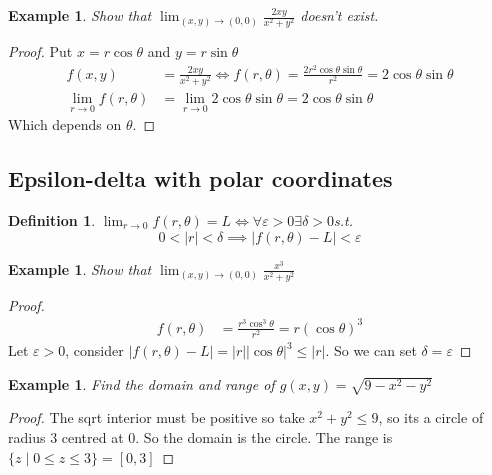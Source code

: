 \documentclass[oneside,11pt,pdftex]{book}%
\numberwithin{equation}{section}
\newtheorem{example}[theorem]{Example}
\newtheorem{definition}[theorem]{Definition}
\numberwithin{section}{chapter}
\numberwithin{equation}{chapter}
\begin{document}
\begin{example}
	Show that $ \lim_{(x,y)\rightarrow (0,0)} \frac{2xy}{x^2+y^2} $ doesn't exist.
\end{example}
\begin{proof}
	Put $ x=r\cos \theta  $ and $ y= r \sin \theta  $
	\begin{align*}
		f(x,y)&=\frac{2xy}{x^2+y^2} \iff f(r,\theta )= \frac{2r^2 \cos \theta \sin \theta }{r^2 }=2 \cos \theta \sin \theta \\
		\lim_{r \rightarrow 0 }f(r,\theta )&=\lim_{r \rightarrow 0}2 \cos \theta \sin \theta = 2 \cos \theta \sin \theta 
	\end{align*}
Which depends on $ \theta  $.
\end{proof}

\subsection{Epsilon-delta with polar coordinates}
\begin{definition}
	$ \lim_{r \rightarrow 0} f(r,\theta)=L \iff \forall \varepsilon>0 \exists \delta >0 $s.t.
	\[ 0<|r|<\delta \implies |f(r,\theta)-L|<\varepsilon \]
\end{definition}

\begin{example}
	Show that $ \lim_{(x,y)\rightarrow (0,0)} \frac{x^3}{x^2+y^2}$
\end{example}
\begin{proof}
	\begin{align}
		f(r,\theta )&= \frac{r^3 \cos^3 \theta }{r^2}=r(\cos \theta )^3
	\end{align}
	Let $ \varepsilon>0 $, consider $ |f(r,\theta)-L|=|r||\cos \theta|^3 \leq |r| $.
	So we can set $ \delta = \varepsilon $
\end{proof}



\begin{example}
	Find the domain and range of $ g(x,y) = \sqrt{9-x^2-y^2}$
\end{example}
\begin{proof}
	The sqrt interior must be positive so take $ x^2+y^2\leq 9 $, so its a circle of radius 3 centred at 0. So the domain is the circle.
	The range is $ \{z \mid 0 \leq z \leq 3\} = [0,3] $
\end{proof}
\end{document}
